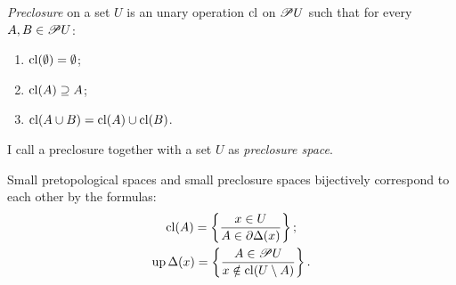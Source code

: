 \begin{defn}
\emph{Preclosure} on a set $U$ is an unary operation
$\operatorname{cl}$ on $\mathscr{P} U$ such that for every $A,B\in\mathscr{P} U$:
\begin{enumerate}
\item $\operatorname{cl}(\emptyset)=\emptyset$;
\item $\operatorname{cl}(A)\supseteq A$;
\item $\operatorname{cl}(A\cup B)=\operatorname{cl}(A)\cup\operatorname{cl}(B)$.
\end{enumerate}

I call a preclosure together with a set $U$
as \emph{preclosure space}.

\end{defn}
\begin{thm}
\label{pretop-bij}Small pretopological spaces and small preclosure
spaces bijectively correspond to each other by the formulas:
\begin{gather}
\operatorname{cl}(A)=\left\{ \frac{x\in U}{A\in\partial\Delta(x)}\right\};\label{pt-cl}\\
\operatorname{up}\Delta(x)=\left\{ \frac{A\in\mathscr{P} U}{x\notin\operatorname{cl}(U\setminus A)}\right\}.\label{pt-neigh}
\end{gather}
\end{thm}
